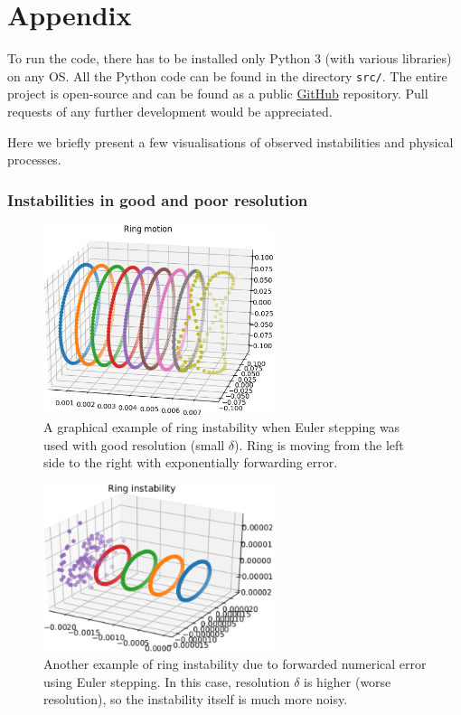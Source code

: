 \chapter{Appendix}

To run the code, there has to be installed only Python 3 (with various libraries) on any OS. All the Python code can be found in the directory \texttt{src/}. The entire project is open-source and can be found as a public \href{https://github.com/KuboBahyl/superfluid}{GitHub} repository. Pull requests of any further development would be appreciated.

Here we briefly present a few visualisations of observed instabilities and physical processes.

\subsection*{Instabilities in good and poor resolution}


\begin{figure}[h]
	\centering
	\includegraphics[width=0.6\textwidth]{graphics/results/euler_instability}
	\caption{A graphical example of ring instability when Euler stepping was used with good resolution (small $\delta$). Ring is moving from the left side to the right with exponentially forwarding error.}
\end{figure}

\begin{figure}[h]
	\centering
	\includegraphics[width=0.6\textwidth]{graphics/results/ring-instability}
	\caption{Another example of ring instability due to forwarded numerical error using Euler stepping. In this case, resolution $\delta$ is higher (worse resolution), so the instability itself is much more noisy.}
\end{figure}

